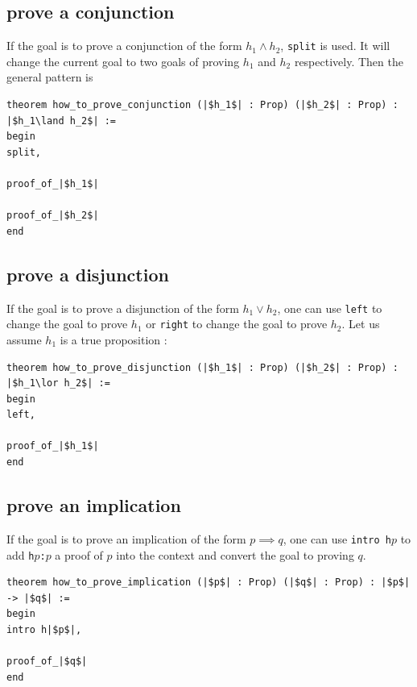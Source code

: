 \documentclass{report}
\theoremstyle{definition}
\begin{document}
\subsection{prove a conjunction}\label{lean:conj}
If the goal is to prove a conjunction of the form $h_1 \land h_2$, {\tt \small split} is used. It will change the current goal to two goals of proving $h_1$ and $h_2$ respectively. Then the general pattern is

\begin{verbatim}
theorem how_to_prove_conjunction (|$h_1$| : Prop) (|$h_2$| : Prop) : |$h_1\land h_2$| :=
begin
split,

proof_of_|$h_1$|

proof_of_|$h_2$|
end
\end{verbatim}


\subsection{prove a disjunction}\label{lean:disjun}
If the goal is to prove a disjunction of the form $h_1 \lor h_2$, one can use {\tt \small left} to change the goal to prove $h_1$ or {\tt \small right} to change the goal to prove $h_2$. Let us assume $h_1$ is a true proposition :

\begin{verbatim}
theorem how_to_prove_disjunction (|$h_1$| : Prop) (|$h_2$| : Prop) : |$h_1\lor h_2$| :=
begin
left,
  
proof_of_|$h_1$|
end
\end{verbatim}


\subsection{prove an implication}\label{lean:imp}
If the goal is to prove an implication of the form $p \implies q$, one can use {\tt \small intro h$p$} to add {\tt \small h$p$:$p$} a proof of $p$ into the context and convert the goal to proving $q$.

\begin{verbatim}
theorem how_to_prove_implication (|$p$| : Prop) (|$q$| : Prop) : |$p$| -> |$q$| :=
begin
intro h|$p$|,
  
proof_of_|$q$|
end
\end{verbatim}
\end{document}
